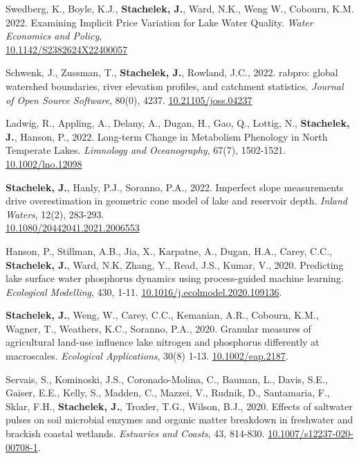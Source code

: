 \item Swedberg, K., Boyle, K.J., \textbf{Stachelek, J.}, Ward, N.K., Weng W., Cobourn, K.M. 2022. Examining Implicit Price Variation for Lake Water Quality. \emph{Water Economics and Policy}, \\ \href{https://doi.org/10.1142/S2382624X22400057}{10.1142/S2382624X22400057}

\item Schwenk, J., Zussman, T., \textbf{Stachelek, J.}, Rowland, J.C., 2022. rabpro: global watershed boundaries, river elevation profiles, and catchment statistics. \emph{Journal of Open Source Software}, 80(0), 4237. \href{https://doi.org/10.21105/joss.04237}{10.21105/joss.04237}

\item Ladwig, R., Appling, A., Delany, A., Dugan, H., Gao, Q., Lottig, N., \textbf{Stachelek, J.}, Hanson, P., 2022. Long-term Change in Metabolism Phenology in North Temperate Lakes. \emph{Limnology and Oceanography}, 67(7), 1502-1521. \href{https://doi.org/10.1002/lno.12098}{10.1002/lno.12098}

\item \textbf{Stachelek, J.}, Hanly, P.J., Soranno, P.A., 2022. Imperfect slope measurements drive overestimation in geometric cone model of lake and reservoir depth. \emph{Inland Waters}, 12(2), 283-293. \\ \href{https://doi.org/10.1080/20442041.2021.2006553}{10.1080/20442041.2021.2006553}

\item Hanson, P., Stillman, A.B., Jia, X., Karpatne, A., Dugan, H.A., Carey, C.C., \textbf{Stachelek, J.}, Ward, N.K, Zhang, Y., Read, J.S., Kumar, V., 2020. Predicting lake surface water phosphorus dynamics using process-guided machine learning. \emph{Ecological Modelling}, 430, 1-11. \href{https://doi.org/10.1016/j.ecolmodel.2020.109136}{10.1016/j.ecolmodel.2020.109136}. %

\item \textbf{Stachelek, J.}, Weng, W., Carey, C.C., Kemanian, A.R., Cobourn, K.M., Wagner, T., Weathers, K.C., Soranno, P.A., 2020. Granular measures of agricultural land-use influence lake nitrogen and phosphorus differently at macroscales. \emph{Ecological Applications}, 30(8) 1-13. \href{https://doi.org/10.1002/eap.2187}{10.1002/eap.2187}. %

\item Servais, S., Kominoski, J.S., Coronado-Molina, C., Bauman, L., Davis, S.E., Gaiser, E.E., Kelly, S., Madden, C., Mazzei, V., Rudnik, D., Santamaria, F., Sklar, F.H., \textbf{Stachelek, J.}, Troxler, T.G., Wilson, B.J., 2020. Effects of saltwater pulses on soil microbial enzymes and organic matter breakdown in freshwater and brackish coastal wetlands. \emph{Estuaries and Coasts}, 43, 814-830. \href{https://doi.org/10.1007/s12237-020-00708-1}{10.1007/s12237-020-00708-1}. %


